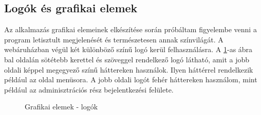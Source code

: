 \subsection{Logók és grafikai elemek}
Az alkalmazás grafikai elemeinek elkészítése során próbáltam figyelembe venni a program letisztult megjelenését és természetesen annak színvilágát. A webáruházban végül két különböző színű logó kerül felhasználásra. A \ref{fig.picture-13}-as ábra bal oldalán sötétebb kerettel és szöveggel rendelkező logó látható, amit a jobb oldali képpel megegyező színű háttereken használok. Ilyen háttérrel rendelkezik például az oldal menüsora. A jobb oldali logót fehér háttereken használom, mint például az adminisztrációs rész bejelentkezési felülete.
\begin{figure}[H]
	\centering
	\hspace{5pt}
	\caption{Grafikai elemek - logók}
	\label{fig.picture-13}
\end{figure}

